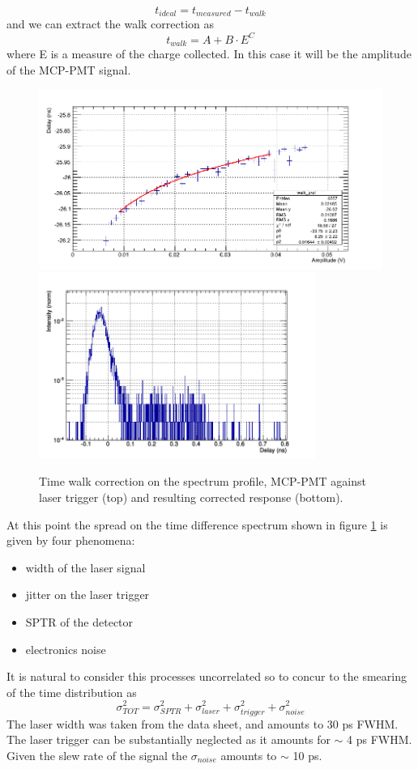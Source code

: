 \begin{equation}
t_{ideal} = t_{measured} - t_{walk}
\end{equation}
and we can extract the walk correction as
\begin{equation}
t_{walk} = A + B\cdot E^{C}
\end{equation}
where E is a measure of the charge collected. In this case it will be the amplitude of the MCP-PMT signal.
\begin{figure}[htbp]
\begin{center}
\includegraphics[width=12cm]{../Pictures/Chapter_8/time_walk_corr.png}
\includegraphics[width=9cm]{../Pictures/Chapter_8/laser.png}
\end{center}
\caption[MCP corrected response (laser trigger)]{Time walk correction on the spectrum profile, MCP-PMT against laser trigger (top) and resulting corrected response (bottom).}
\label{fig:mcp_laser_walk}
\end{figure}
At this point the spread on the time difference spectrum shown in figure \ref{fig:mcp_laser_walk} is given by four phenomena:
\begin{itemize}
\item width of the laser signal
\item jitter on the laser trigger
\item SPTR of the detector
\item electronics noise
\end{itemize}
It is natural to consider this processes uncorrelated so to concur to the smearing of the time distribution as
\begin{equation}
\sigma _{TOT}^{2} = \sigma _{SPTR}^{2} + \sigma _{laser}^{2} + \sigma _{trigger}^{2} + \sigma _{noise}^{2} 
\end{equation}
The laser width was taken from the data sheet, and amounts to 30 ps FWHM. The laser trigger can be substantially neglected as it amounts for $\sim$ 4 ps FWHM. Given the slew rate of the signal the $\sigma _{noise}$ amounts to $\sim$ 10 ps.

